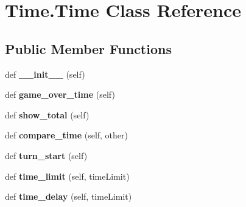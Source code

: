 \hypertarget{class_time_1_1_time}{}\section{Time.\+Time Class Reference}
\label{class_time_1_1_time}
\subsection*{Public Member Functions}
\begin{DoxyCompactItemize}
\item 
\mbox{\label{class_time_1_1_time_a2fcd7309de0e40d3550b6fd97c2551bc}} 
def {\bfseries \+\_\+\+\_\+init\+\_\+\+\_\+} (self)
\item 
\mbox{\label{class_time_1_1_time_aafb2c5f50e604069848cf5dea89a0594}} 
def {\bfseries game\+\_\+over\+\_\+time} (self)
\item 
\mbox{\label{class_time_1_1_time_aaf3b423ec6a81c3737a01b89e76051b0}} 
def {\bfseries show\+\_\+total} (self)
\item 
\mbox{\label{class_time_1_1_time_ae62071f9db0a182d0ccc85bfbf8b2ebc}} 
def {\bfseries compare\+\_\+time} (self, other)
\item 
\mbox{\label{class_time_1_1_time_abab694cc273962120aa1260e46634436}} 
def {\bfseries turn\+\_\+start} (self)
\item 
\mbox{\label{class_time_1_1_time_a431f5589ccc49f1292dac1e7d9ac264f}} 
def {\bfseries time\+\_\+limit} (self, time\+Limit)
\item 
\mbox{\label{class_time_1_1_time_ae284d02dadb90298689d4711a8c6f992}} 
def {\bfseries time\+\_\+delay} (self, time\+Limit)
\end{DoxyCompactItemize}
